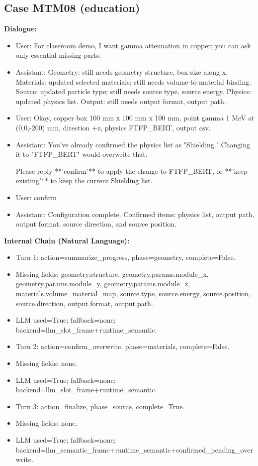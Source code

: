 \documentclass[11pt]{ctexart}
\begin{document}
\subsection{Case MTM08 (education)}
\textbf{Dialogue:}
\begin{itemize}
\item User: For classroom demo, I want gamma attenuation in copper; you can ask only essential missing parts.
\item Assistant: Geometry: still needs geometry structure, box size along x. Materials: updated selected materials; still needs volume-to-material binding. Source: updated particle type; still needs source type, source energy. Physics: updated physics list. Output: still needs output format, output path.
\item User: Okay, copper box 100 mm x 100 mm x 100 mm, point gamma 1 MeV at (0,0,-200) mm, direction +z, physics FTFP\_BERT, output csv.
\item Assistant: You've already confirmed the physics list as "Shielding." Changing it to "FTFP\_BERT" would overwrite that.

Please reply **'confirm'** to apply the change to FTFP\_BERT, or **'keep existing'** to keep the current Shielding list.
\item User: confirm
\item Assistant: Configuration complete. Confirmed items: physics list, output path, output format, source direction, and source position.
\end{itemize}
\textbf{Internal Chain (Natural Language):}
\begin{itemize}
\item Turn 1: action=summarize\_progress, phase=geometry, complete=False.
\item Missing fields: geometry.structure, geometry.params.module\_x, geometry.params.module\_y, geometry.params.module\_z, materials.volume\_material\_map, source.type, source.energy, source.position, source.direction, output.format, output.path.
\item LLM used=True; fallback=none; backend=llm\_slot\_frame+runtime\_semantic.
\item Turn 2: action=confirm\_overwrite, phase=materials, complete=False.
\item Missing fields: none.
\item LLM used=True; fallback=none; backend=llm\_slot\_frame+runtime\_semantic.
\item Turn 3: action=finalize, phase=source, complete=True.
\item Missing fields: none.
\item LLM used=True; fallback=none; backend=llm\_semantic\_frame+runtime\_semantic+confirmed\_pending\_overwrite.
\end{itemize}
\end{document}
